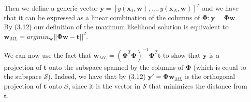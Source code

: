 Then we define a generic vector $\mathbf{y} = [y(\mathbf{x}_1, \mathbf{w}), \dots, y(\mathbf{x}_N, \mathbf{w})]^T$ and we have that it can be expressed as a linear combination of the columns of $\mathbf{\Phi}: \mathbf{y} = \mathbf{\Phi} \mathbf{w}$.
By (3.12) our definition of the maximum likelihood solution is equivalent to $\mathbf{w}_{ML} = argmin_{\mathbf{w}} ||\mathbf{\Phi}\mathbf{w} - \mathbf{t}||^2$.

We can now use the fact that $\mathbf{w}_{ML} = (\mathbf{\Phi}^T\mathbf{\Phi})^{-1}\mathbf{\Phi}^T \mathbf{t}$ to show that $\mathbf{y}$ is a projection of $\mathbf{t}$ onto the subspace spanned by the columns of $\mathbf{\Phi}$ (which is equal to the subspace $\mathcal{S}$).
Indeed, we have that by (3.12) $\mathbf{y}' = \mathbf{\Phi}\mathbf{w}_{ML}$ is the orthogonal projection of $\mathbf{t}$ onto $\mathcal{S}$, since it is the vector in $\mathcal{S}$ that minimizes the distance from $\mathbf{t}$.